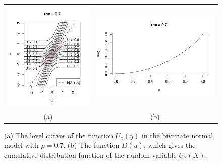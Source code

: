 \documentclass[12pt]{article}
\begin{document}
\begin{figure}[h]
\centering
\begin{tabular}{cc}
\includegraphics[scale = 0.6, clip = true, trim = 0.1in 0 0 0.8in]{illus_ufunc_0_7.pdf} &
\includegraphics[scale = 0.65, clip = true, trim = 0 -0.3in 0 0.5in]{illus_kfunc_0_7.pdf}\\
(a) & (b)
\end{tabular}

\caption{
(a) The level curves of the function $U_x(y)$ in the bivariate normal model with $\rho = 0.7$.
(b) The function $\bar{D}(u)$, which gives the cumulative distribution function of the random variable $U_Y(X)$.}\label{fig:toy3}
\end{figure}
\end{document}
